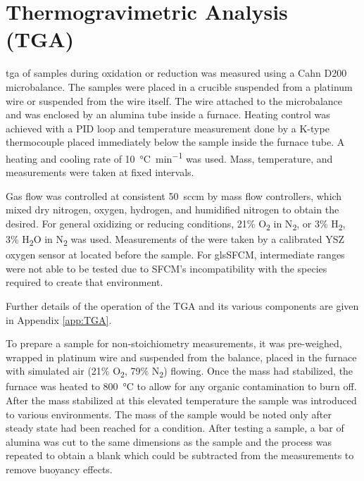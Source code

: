 \section{Thermogravimetric Analysis (TGA)}
    \Gls{tga} of samples during oxidation or reduction was measured using a Cahn D200 microbalance.
    The samples were placed in a crucible suspended from a platinum wire or suspended from the wire itself.
    The wire attached to the microbalance and was enclosed by an alumina tube inside a furnace.
    Heating control was achieved with a PID loop and temperature measurement done by a K-type thermocouple placed immediately below the sample inside the furnace tube.
    A heating and cooling rate of \SI{10}{\celsius\per\minute} was used.
    Mass, temperature, and  measurements were taken at fixed intervals.

    Gas flow was controlled at consistent \SI{50}{sccm} by mass flow controllers, which mixed dry nitrogen, oxygen, hydrogen, and humidified nitrogen to obtain the  desired.
    For general oxidizing or reducing conditions, 21\% O\textsubscript{2} in N\textsubscript{2}, or 3\% H\textsubscript{2}, 3\% H\textsubscript{2}O in N\textsubscript{2} was used.
    Measurements of the  were taken by a calibrated YSZ oxygen sensor at  located before the sample.
    For gls{SFCM}, intermediate  ranges were not able to be tested due to SFCM's incompatibility with the species required to create that environment.

    Further details of the operation of the TGA and its various components are given in Appendix \ref{app:TGA}.

    To prepare a sample for non-stoichiometry measurements, it was pre-weighed, wrapped in platinum wire and suspended from the balance, placed in the furnace with simulated air (21\% O\textsubscript{2}, 79\% N\textsubscript{2}) flowing.
    Once the mass had stabilized, the furnace was heated to \SI{800}{\celsius} to allow for any organic contamination to burn off.
    After the mass stabilized at this elevated temperature the sample was introduced to various environments.
    The mass of the sample would be noted only after steady state had been reached for a condition.
    After testing a sample, a bar of alumina was cut to the same dimensions as the sample and the process was repeated to obtain a blank which could be subtracted from the measurements to remove buoyancy effects.


